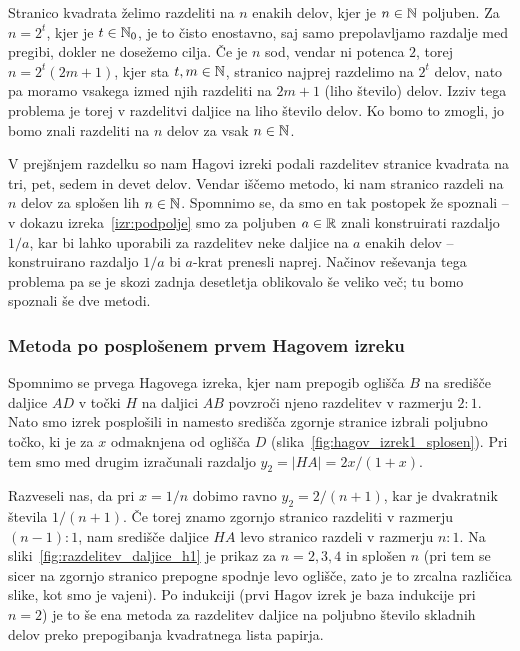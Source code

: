 Stranico kvadrata želimo razdeliti na $n$ enakih delov, kjer je $n \in \mathbb N$ poljuben. Za $n = 2^t$, kjer je $t \in \mathbb N_0$, je to čisto enostavno, saj samo prepolavljamo razdalje med pregibi, dokler ne dosežemo cilja. Če je $n$ sod, vendar ni potenca $2$, torej $n = 2^t(2m + 1)$, kjer sta $t, m \in \mathbb N$, stranico najprej razdelimo na $2^t$ delov, nato pa moramo vsakega izmed njih razdeliti na $2m + 1$ (liho število) delov. Izziv tega problema je torej v razdelitvi daljice na liho število delov. Ko bomo to zmogli, jo bomo znali razdeliti na $n$ delov za vsak $n \in \mathbb N$.

V prejšnjem razdelku so nam Hagovi izreki podali razdelitev stranice kvadrata na tri, pet, sedem in devet delov. Vendar iščemo metodo, ki nam stranico razdeli na $n$ delov za splošen lih $n \in \mathbb N$. Spomnimo se, da smo en tak postopek že spoznali -- v dokazu izreka~\ref{izr:podpolje} smo za poljuben $a \in \mathbb R$ znali konstruirati razdaljo $1/a$, kar bi lahko uporabili za razdelitev neke daljice na $a$ enakih delov -- konstruirano razdaljo $1/a$ bi $a$-krat prenesli naprej. Načinov reševanja tega problema pa se je skozi zadnja desetletja oblikovalo še veliko več; tu bomo spoznali še dve metodi.

\subsubsection*{Metoda po posplošenem prvem Hagovem izreku}
\label{podpogl:razdelitev_hag1_spl}

Spomnimo se prvega Hagovega izreka, kjer nam prepogib oglišča $B$ na središče daljice $AD$ v točki $H$ na daljici $AB$ povzroči njeno razdelitev v razmerju $2:1$. Nato smo izrek posplošili in namesto središča zgornje stranice izbrali poljubno točko, ki je za $x$ odmaknjena od oglišča $D$ (slika~\ref{fig:hagov_izrek1_splosen}). Pri tem smo med drugim izračunali razdaljo $y_2 = |HA| = 2x/(1+x)$.

Razveseli nas, da pri $x = 1/n$ dobimo ravno $y_2 = 2/(n+1)$, kar je dvakratnik števila $1/(n+1)$. Če torej znamo zgornjo stranico razdeliti v razmerju $(n-1):1$, nam središče daljice $HA$ levo stranico razdeli v razmerju $n:1$. Na sliki~\ref{fig:razdelitev_daljice_h1} je prikaz za $n = 2, 3, 4$ in splošen $n$ (pri tem se sicer na zgornjo stranico prepogne spodnje levo oglišče, zato je to zrcalna različica slike, kot smo je vajeni). Po indukciji (prvi Hagov izrek je baza indukcije pri $n=2$) je to še ena metoda za razdelitev daljice na poljubno število skladnih delov preko prepogibanja kvadratnega lista papirja.

